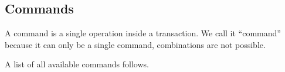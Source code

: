 \subsection{Commands}

A command is a single operation inside a transaction. We call it ``command''
because it can only be a single command, combinations are not possible.

A list of all available commands follows.

